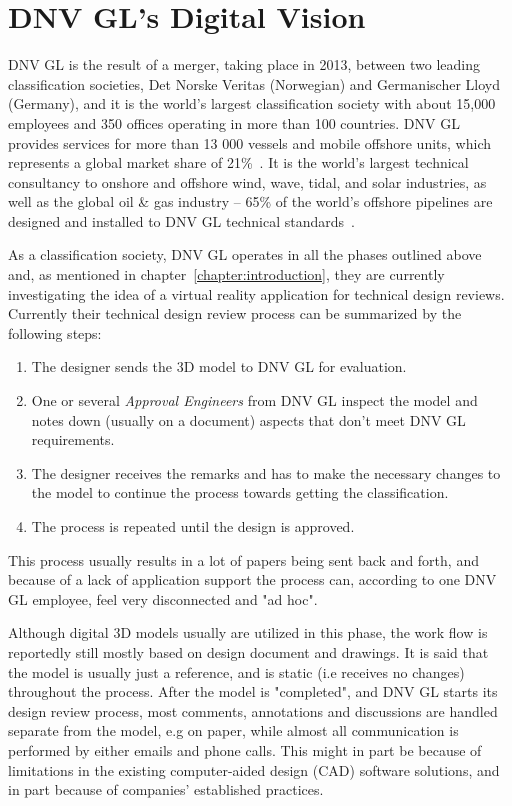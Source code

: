 \section{DNV GL's Digital Vision}
DNV GL is the result of a merger, taking place in 2013, between two leading classification societies, Det Norske Veritas (Norwegian) and Germanischer Lloyd (Germany),
and it is the world's largest classification society with about 15,000 employees and 350 offices operating in more than 100 countries. 
DNV GL provides services for more than 13 000 vessels and mobile offshore units, which represents a global market share of 21\%~\citep{TO:DNVGL}.
It is the world's largest technical consultancy to onshore and offshore wind, wave, tidal, and solar industries, as well as the global oil \& gas industry 
-- 65\% of the world’s offshore pipelines are designed and installed to DNV GL technical standards~\citep{MTN:DNVGL}. 

As a classification society, DNV GL operates in all the phases outlined above and, as mentioned in chapter~\ref{chapter:introduction}, they are 
currently investigating the idea of a virtual reality application for technical design reviews. 
Currently their technical design review process can be summarized by the following steps: 

\begin{enumerate}
	\item The designer sends the 3D model to DNV GL for evaluation.
	\item One or several \textit{Approval Engineers} from DNV GL inspect the model and notes down (usually on a document) aspects that don't meet DNV GL requirements.
	\item The designer receives the remarks and has to make the necessary changes to the model to continue the process towards getting the classification.
	\item The process is repeated until the design is approved.
\end{enumerate}

This process usually results in a lot of papers being sent back and forth, and because of a lack of application support the process can, according to one DNV GL employee,
feel very disconnected and "ad hoc". 

Although digital 3D models usually are utilized in this phase, the work flow is reportedly still mostly based on design document and drawings.  
It is said that the model is usually just a reference, and is static (i.e receives no changes) throughout the process. After the model is "completed", and DNV GL starts
its design review process, most comments, annotations and discussions are handled separate from the model, e.g on paper, while almost all communication
is performed by either emails and phone calls.
This might in part be because of limitations in the existing computer-aided design (CAD) software solutions, and in part because of companies' established practices.

